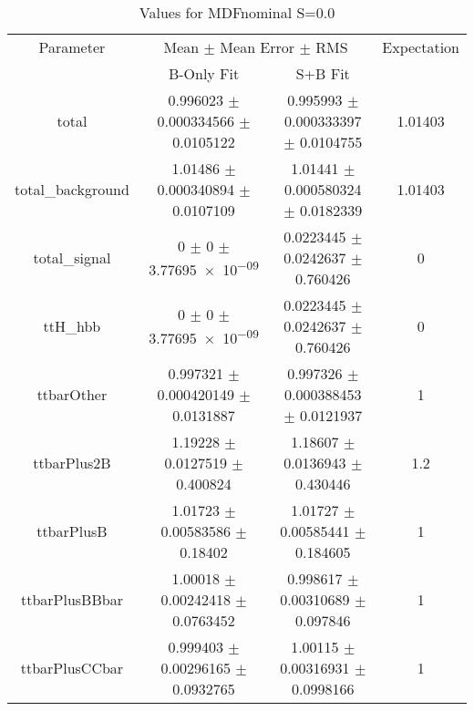 \begin{table}
\centering
\caption{Values for MDFnominal S=0.0}
\begin{tabular}{cccc}
\toprule
Parameter & \multicolumn{2}{c}{Mean $\pm$ Mean Error $\pm$ RMS} & Expectation\\
 & B-Only Fit & S+B Fit & \\
\midrule
total & \num{0.996023} $\pm$ \num{0.000334566} $\pm$ \num{0.0105122} & \num{0.995993} $\pm$ \num{0.000333397} $\pm$ \num{0.0104755} & \num{1.01403}\\
total\_background & \num{1.01486} $\pm$ \num{0.000340894} $\pm$ \num{0.0107109} & \num{1.01441} $\pm$ \num{0.000580324} $\pm$ \num{0.0182339} & \num{1.01403}\\
total\_signal & \num{0} $\pm$ \num{0} $\pm$ \num{3.77695e-09} & \num{0.0223445} $\pm$ \num{0.0242637} $\pm$ \num{0.760426} & \num{0}\\
ttH\_hbb & \num{0} $\pm$ \num{0} $\pm$ \num{3.77695e-09} & \num{0.0223445} $\pm$ \num{0.0242637} $\pm$ \num{0.760426} & \num{0}\\
ttbarOther & \num{0.997321} $\pm$ \num{0.000420149} $\pm$ \num{0.0131887} & \num{0.997326} $\pm$ \num{0.000388453} $\pm$ \num{0.0121937} & \num{1}\\
ttbarPlus2B & \num{1.19228} $\pm$ \num{0.0127519} $\pm$ \num{0.400824} & \num{1.18607} $\pm$ \num{0.0136943} $\pm$ \num{0.430446} & \num{1.2}\\
ttbarPlusB & \num{1.01723} $\pm$ \num{0.00583586} $\pm$ \num{0.18402} & \num{1.01727} $\pm$ \num{0.00585441} $\pm$ \num{0.184605} & \num{1}\\
ttbarPlusBBbar & \num{1.00018} $\pm$ \num{0.00242418} $\pm$ \num{0.0763452} & \num{0.998617} $\pm$ \num{0.00310689} $\pm$ \num{0.097846} & \num{1}\\
ttbarPlusCCbar & \num{0.999403} $\pm$ \num{0.00296165} $\pm$ \num{0.0932765} & \num{1.00115} $\pm$ \num{0.00316931} $\pm$ \num{0.0998166} & \num{1}\\
\bottomrule
\end{tabular}
\end{table}